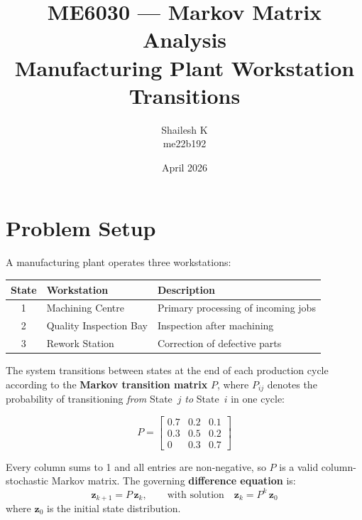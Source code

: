 \documentclass[12pt, a4paper]{article}
\title{\textbf{ME6030 --- Markov Matrix Analysis}\\[0.5em]
\large Manufacturing Plant Workstation Transitions}
\author{Shailesh K \\ me22b192}
\date{April 2026}
\begin{document}
\maketitle

\section{Problem Setup}

A manufacturing plant operates three workstations:

\begin{center}
\begin{tabular}{clp{8cm}}
\toprule
\textbf{State} & \textbf{Workstation} & \textbf{Description} \\
\midrule
1 & Machining Centre       & Primary processing of incoming jobs \\
2 & Quality Inspection Bay & Inspection after machining \\
3 & Rework Station         & Correction of defective parts \\
\bottomrule
\end{tabular}
\end{center}

\vspace{0.5em}
The system transitions between states at the end of each production cycle according
to the \textbf{Markov transition matrix} $P$, where $P_{ij}$ denotes the probability
of transitioning \emph{from} State~$j$ \emph{to} State~$i$ in one cycle:

\begin{equation}
  P =
  \begin{bmatrix}
    0.7 & 0.2 & 0.1 \\
    0.3 & 0.5 & 0.2 \\
    0   & 0.3 & 0.7
  \end{bmatrix}
\end{equation}

Every column sums to 1 and all entries are non-negative, so $P$ is a valid
column-stochastic Markov matrix. The governing \textbf{difference equation} is:
\begin{equation}
  \mathbf{z}_{k+1} = P\,\mathbf{z}_k, \qquad \text{with solution} \quad
  \mathbf{z}_k = P^k\,\mathbf{z}_0
\end{equation}
where $\mathbf{z}_0$ is the initial state distribution.

\end{document}

